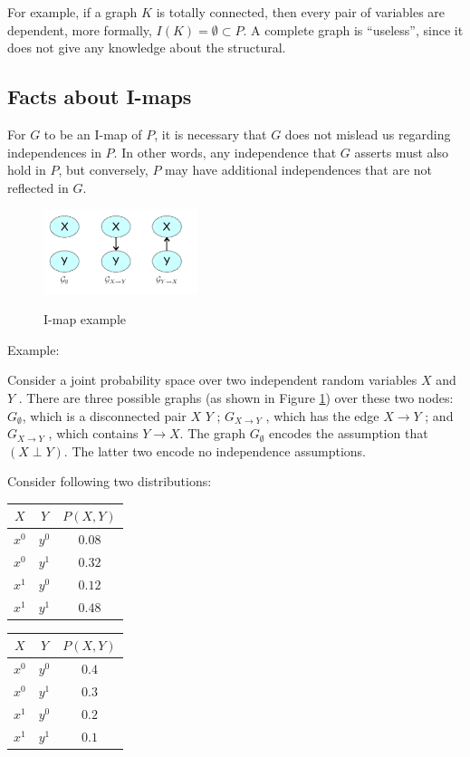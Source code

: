 \documentclass[twoside]{article}
\begin{document}
For example, if a graph \(K\) is totally connected, then every pair of variables are dependent, more formally, \(I(K) = \emptyset \subset P\). A complete graph is ``useless'', since it does not give any knowledge about the structural.

\subsection{Facts about I-maps}
For \(G\) to be an I-map of \(P\), it is necessary that \(G\) does not mislead us regarding independences in \(P\). In other words, any independence that \(G\) asserts must also hold in \(P\), but conversely, \(P\) may have additional independences that are not reflected in \(G\).

\begin{figure}[!bph]
\centering
\includegraphics[width=0.4\textwidth]{assets/imap_example.png}
\caption{\label{fig:imap_example}} I-map example
\end{figure}

Example:

Consider a joint probability space over two independent random variables \(X\) and \(Y\) . There are three possible graphs (as shown in Figure \ref{fig:imap_example}) over these two nodes: \(G_\emptyset\), which is a disconnected pair \(X\) \(Y\) ; \(G_{X\rightarrow Y}\) , which has the edge \(X\rightarrow Y\) ; and \(G_{X\rightarrow Y}\) , which contains \(Y\rightarrow X\). The graph \(G_\emptyset\) encodes the assumption that \((X \perp Y )\). The latter two encode no independence assumptions.

Consider following two distributions:

\begin{table}[!htbp]
\parbox{.3\linewidth}{
\begin{tabular}{cc|c}
\(X\) & \(Y\) & \(P(X, Y)\)\\ \hline
\(x^0\) & \(y^0\) & \(0.08\)\\
\(x^0\) & \(y^1\) & \(0.32\)\\
\(x^1\) & \(y^0\) & \(0.12\)\\
\(x^1\) & \(y^1\) & \(0.48\)\\
\end{tabular}
\hfill\hfill
\parbox{.3\linewidth}{
\begin{tabular}{cc|c}
\(X\) & \(Y\) & \(P(X, Y)\)\\ \hline
\(x^0\) & \(y^0\) & \(0.4\)\\
\(x^0\) & \(y^1\) & \(0.3\)\\
\(x^1\) & \(y^0\) & \(0.2\)\\
\(x^1\) & \(y^1\) & \(0.1\)\\
\end{tabular}
}
}
\end{table}
\end{document}
